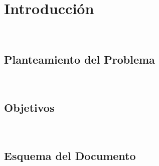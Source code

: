 %





\rehead{\mytitle}
\lohead{\leftmark}
\chapter{Introducción}~\hypertarget{ch:chapter_01}{}
\label{ch:chapter_01}

\lipsum[1-2]



\section{Planteamiento del Problema}~\hypertarget{sec:sec110}{}
\label{sec:sec110}\bigskip





\section{Objetivos}~\hypertarget{sec:sec120}{}
\label{sec:sec120}\bigskip



\section{Esquema del Documento}~\hypertarget{sec:sec130}{}
\label{sec:sec130}

